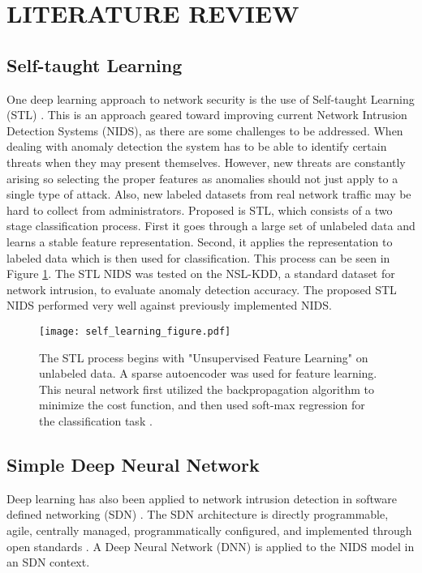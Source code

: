 \documentclass[letterpaper, 10 pt, conference]{ieeeconf}
\begin{document}
\hfill
\section{LITERATURE REVIEW}

\subsection{Self-taught Learning}
One deep learning approach to network security is the use of Self-taught Learning (STL) \cite{c2}. This is an approach geared toward improving current Network Intrusion Detection Systems (NIDS), as there are some challenges to be addressed. When dealing with anomaly detection the system has to be able to identify certain threats when they may present themselves. However, new threats are constantly arising so selecting the proper features as anomalies should not just apply to a single type of attack. Also, new labeled datasets from real network traffic may be hard to collect from administrators. Proposed is STL, which consists of a two stage classification process. First it goes through a large set of unlabeled data and learns a stable feature representation. Second, it applies the representation to labeled data which is then used for classification. This process can be seen in Figure \ref{self_learning_figure}. The STL NIDS was tested on the NSL-KDD, a standard dataset for network intrusion, to evaluate anomaly detection accuracy. The proposed STL NIDS performed very well against previously implemented NIDS.

\begin{figure}[ht!] %
\centering
\hspace*{0.4cm}
\texttt{[image: self\_learning\_figure.pdf]}
\vspace*{-25mm}
\caption{The STL process begins with "Unsupervised Feature Learning" on unlabeled data. A sparse autoencoder was used for feature learning. This neural network first utilized the backpropagation algorithm to minimize the cost function, and then used soft-max regression for the classification task \cite{c2}.}
\label{self_learning_figure}
\end{figure}

\hfill
\subsection{Simple Deep Neural Network}
Deep learning has also been applied to network intrusion detection in software defined networking (SDN) \cite{c3}. The SDN architecture is directly programmable, agile, centrally managed, programmatically configured, and implemented through open standards \cite{c12}. A Deep Neural Network (DNN) is applied to the NIDS model in an SDN context. 
\end{document}
